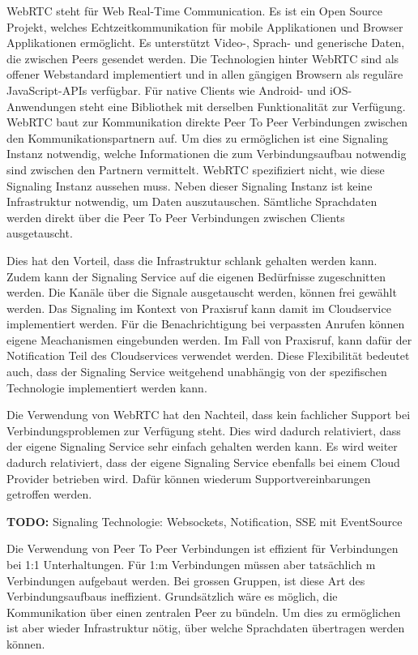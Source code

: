 WebRTC steht für Web Real-Time Communication.
Es ist ein Open Source Projekt, welches Echtzeitkommunikation für mobile Applikationen und Browser Applikationen ermöglicht.
Es unterstützt Video-, Sprach- und generische Daten, die zwischen Peers gesendet werden.
Die Technologien hinter WebRTC sind als offener Webstandard implementiert und in allen gängigen Browsern als reguläre JavaScript-APIs verfügbar.
Für native Clients wie Android- und iOS-Anwendungen steht eine Bibliothek mit derselben Funktionalität zur Verfügung.\cite{webrtc}
WebRTC baut zur Kommunikation direkte Peer To Peer Verbindungen zwischen den Kommunikationspartnern auf.
Um dies zu ermöglichen ist eine Signaling Instanz notwendig, welche Informationen die zum Verbindungsaufbau notwendig sind zwischen den Partnern vermittelt.
WebRTC spezifiziert nicht, wie diese Signaling Instanz aussehen muss.
Neben dieser Signaling Instanz ist keine Infrastruktur notwendig, um Daten auszutauschen.
Sämtliche Sprachdaten werden direkt über die Peer To Peer Verbindungen zwischen Clients ausgetauscht.

Dies hat den Vorteil, dass die Infrastruktur schlank gehalten werden kann.
Zudem kann der Signaling Service auf die eigenen Bedürfnisse zugeschnitten werden.
Die Kanäle über die Signale ausgetauscht werden, können frei gewählt werden.
Das Signaling im Kontext von Praxisruf kann damit im Cloudservice implementiert werden.
Für die Benachrichtigung bei verpassten Anrufen können eigene Meachanismen eingebunden werden.
Im Fall von Praxisruf, kann dafür der Notification Teil des Cloudservices verwendet werden.
Diese Flexibilität bedeutet auch, dass der Signaling Service weitgehend unabhängig von der spezifischen Technologie implementiert werden kann.

\clearpage

Die Verwendung von WebRTC hat den Nachteil, dass kein fachlicher Support bei Verbindungsproblemen zur Verfügung steht.
Dies wird dadurch relativiert, dass der eigene Signaling Service sehr einfach gehalten werden kann.
Es wird weiter dadurch relativiert, dass der eigene Signaling Service ebenfalls bei einem Cloud Provider betrieben wird.
Dafür können wiederum Supportvereinbarungen getroffen werden.

\textbf{TODO:} Signaling Technologie: Websockets, Notification, SSE mit EventSource

Die Verwendung von Peer To Peer Verbindungen ist effizient für Verbindungen bei 1:1 Unterhaltungen.
Für 1:m Verbindungen müssen aber tatsächlich m Verbindungen aufgebaut werden.
Bei grossen Gruppen, ist diese Art des Verbindungsaufbaus ineffizient.
Grundsätzlich wäre es möglich, die Kommunikation über einen zentralen Peer zu bündeln.\cite{webrtc_mesh}
Um dies zu ermöglichen ist aber wieder Infrastruktur nötig, über welche Sprachdaten übertragen werden können.


